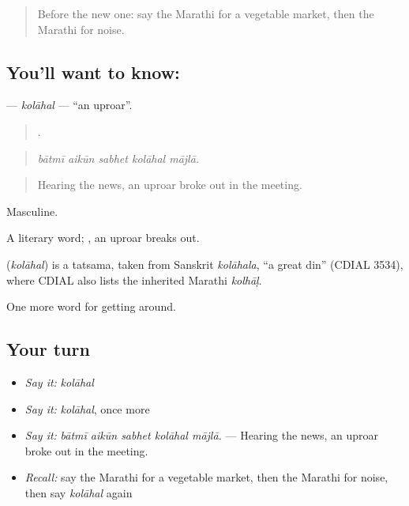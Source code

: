 \begin{quote}
Before the new one: say the Marathi for a vegetable market, then the Marathi for noise.
\end{quote}

\subsection*{You'll want to know: }
\textbf{} — \emph{kolāhal} — \textquotedblleft{}an uproar\textquotedblright{}.

\begin{quote}
    .
\end{quote}

\begin{quote}
\emph{bātmī aikūn sabhet kolāhal mājlā.}
\end{quote}

\begin{quote}
Hearing the news, an uproar broke out in the meeting.
\end{quote}

Masculine.

A literary word;  , an uproar breaks out.

\begin{cousinweb}
\textbf{} (\emph{kolāhal}) is a tatsama, taken from Sanskrit \emph{kolāhala}, \textquotedblleft{}a great din\textquotedblright{} (CDIAL 3534), where CDIAL also lists the inherited Marathi \emph{kolhāḷ}.
\end{cousinweb}

\begin{grammarlens}[title={What you've built}]
One more word for getting around.
\end{grammarlens}

\subsection*{Your turn}
\begin{itemize}
\raggedright
  \item \emph{Say it:} \emph{kolāhal}
  \item \emph{Say it:} \emph{kolāhal}, once more
  \item \emph{Say it:} \emph{bātmī aikūn sabhet kolāhal mājlā.} — Hearing the news, an uproar broke out in the meeting.
  \item \emph{Recall:} say the Marathi for a vegetable market, then the Marathi for noise, then say \emph{kolāhal} again
\end{itemize}


